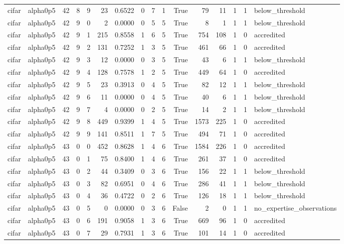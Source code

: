 \begin{tabular}{llrrrrrrrrrrrrrl}
cifar & alpha0p5 & 42 & 8 & 9 & 23 & 0.6522 & 0 & 7 & 1 & True & 79 & 11 & 1 & 1 & below\_threshold \\
cifar & alpha0p5 & 42 & 9 & 0 & 2 & 0.0000 & 0 & 5 & 5 & True & 8 & 1 & 1 & 1 & below\_threshold \\
cifar & alpha0p5 & 42 & 9 & 1 & 215 & 0.8558 & 1 & 6 & 5 & True & 754 & 108 & 1 & 0 & accredited \\
cifar & alpha0p5 & 42 & 9 & 2 & 131 & 0.7252 & 1 & 3 & 5 & True & 461 & 66 & 1 & 0 & accredited \\
cifar & alpha0p5 & 42 & 9 & 3 & 12 & 0.0000 & 0 & 3 & 5 & True & 43 & 6 & 1 & 1 & below\_threshold \\
cifar & alpha0p5 & 42 & 9 & 4 & 128 & 0.7578 & 1 & 2 & 5 & True & 449 & 64 & 1 & 0 & accredited \\
cifar & alpha0p5 & 42 & 9 & 5 & 23 & 0.3913 & 0 & 4 & 5 & True & 82 & 12 & 1 & 1 & below\_threshold \\
cifar & alpha0p5 & 42 & 9 & 6 & 11 & 0.0000 & 0 & 4 & 5 & True & 40 & 6 & 1 & 1 & below\_threshold \\
cifar & alpha0p5 & 42 & 9 & 7 & 4 & 0.0000 & 0 & 2 & 5 & True & 14 & 2 & 1 & 1 & below\_threshold \\
cifar & alpha0p5 & 42 & 9 & 8 & 449 & 0.9399 & 1 & 4 & 5 & True & 1573 & 225 & 1 & 0 & accredited \\
cifar & alpha0p5 & 42 & 9 & 9 & 141 & 0.8511 & 1 & 7 & 5 & True & 494 & 71 & 1 & 0 & accredited \\
cifar & alpha0p5 & 43 & 0 & 0 & 452 & 0.8628 & 1 & 4 & 6 & True & 1584 & 226 & 1 & 0 & accredited \\
cifar & alpha0p5 & 43 & 0 & 1 & 75 & 0.8400 & 1 & 4 & 6 & True & 261 & 37 & 1 & 0 & accredited \\
cifar & alpha0p5 & 43 & 0 & 2 & 44 & 0.3409 & 0 & 3 & 6 & True & 156 & 22 & 1 & 1 & below\_threshold \\
cifar & alpha0p5 & 43 & 0 & 3 & 82 & 0.6951 & 0 & 4 & 6 & True & 286 & 41 & 1 & 1 & below\_threshold \\
cifar & alpha0p5 & 43 & 0 & 4 & 36 & 0.4722 & 0 & 2 & 6 & True & 126 & 18 & 1 & 1 & below\_threshold \\
cifar & alpha0p5 & 43 & 0 & 5 & 0 & 0.0000 & 0 & 3 & 6 & False & 2 & 0 & 1 & 1 & no\_expertise\_observations \\
cifar & alpha0p5 & 43 & 0 & 6 & 191 & 0.9058 & 1 & 3 & 6 & True & 669 & 96 & 1 & 0 & accredited \\
cifar & alpha0p5 & 43 & 0 & 7 & 29 & 0.7931 & 1 & 3 & 6 & True & 101 & 14 & 1 & 0 & accredited \\

\end{tabular}
